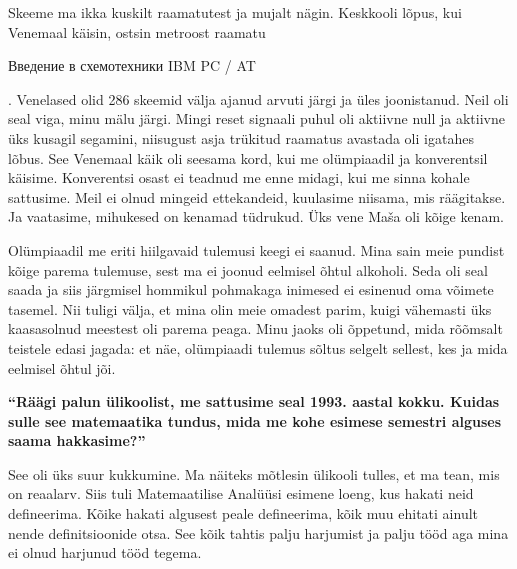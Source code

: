 Skeeme ma ikka kuskilt raamatutest ja mujalt nägin. Keskkooli lõpus, kui Venemaal käisin, ostsin metroost raamatu \begin{russian}Введение в схемотехники IBM PC / AT\end{russian}. Venelased olid 286 skeemid välja ajanud arvuti järgi ja üles joonistanud. Neil oli seal viga, minu mälu järgi. Mingi reset signaali puhul oli aktiivne null ja aktiivne üks kusagil segamini,  niisugust asja trükitud raamatus avastada oli igatahes lõbus. See Venemaal käik oli seesama kord, kui me olümpiaadil ja konverentsil käisime. Konverentsi osast  ei teadnud me enne midagi, kui me sinna kohale sattusime. Meil ei olnud mingeid ettekandeid, kuulasime niisama, mis räägitakse. Ja vaatasime, mihukesed on kenamad tüdrukud. Üks vene Maša oli kõige kenam. 

Olümpiaadil me eriti hiilgavaid tulemusi keegi ei saanud. Mina sain meie pundist kõige parema tulemuse, sest ma ei joonud eelmisel õhtul alkoholi. Seda oli seal saada ja siis järgmisel hommikul pohmakaga inimesed ei esinenud oma võimete tasemel. Nii tuligi välja, et mina olin meie omadest parim, kuigi vähemasti üks kaasasolnud meestest oli parema peaga. Minu jaoks oli õppetund, mida rõõmsalt teistele edasi jagada: et näe, olümpiaadi tulemus sõltus selgelt sellest, kes ja mida eelmisel õhtul jõi. 

\textbf{\enquote{Räägi palun ülikoolist, me sattusime seal 1993. aastal kokku. Kuidas sulle see matemaatika tundus, mida me kohe esimese semestri alguses saama hakkasime?}}

See oli üks suur kukkumine. Ma näiteks mõtlesin ülikooli tulles, et ma tean, mis on reaalarv. Siis tuli Matemaatilise Analüüsi esimene loeng, kus hakati neid defineerima. Kõike hakati algusest peale defineerima, kõik muu ehitati ainult nende definitsioonide otsa. See kõik tahtis palju harjumist ja palju tööd aga mina ei olnud harjunud tööd tegema. 

